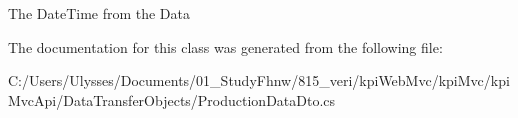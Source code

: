 The Date\+Time from the Data 



The documentation for this class was generated from the following file\+:\begin{DoxyCompactItemize}
\item 
C\+:/\+Users/\+Ulysses/\+Documents/01\+\_\+\+Study\+Fhnw/815\+\_\+veri/kpi\+Web\+Mvc/kpi\+Mvc/kpi\+Mvc\+Api/\+Data\+Transfer\+Objects/Production\+Data\+Dto.\+cs\end{DoxyCompactItemize}
